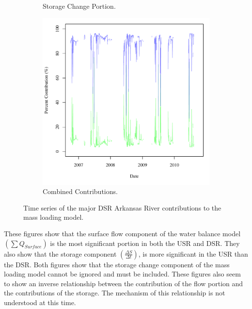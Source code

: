 \begin{linenumbers}
\begin{figure}[htbp]
\begin{subfigure}{0.5\textwidth}
		\caption{Storage Change Portion.}
	\end{subfigure}
	\tablevspace
	\begin{subfigure}{0.5\textwidth}
		\centering
		\includegraphics[width=\tableCustomSize]{"Figures/Results_DSR/Stochastic/M Mass Contrib 3"}
		\caption{Combined Contributions.}
	\end{subfigure}
	\caption[Time series of the major DSR Arkansas River contributions to the mass loading model.]{Time series of the major DSR Arkansas River contributions to the mass loading model.}
	\label{fig:DSRMassContrib}
\end{figure}

These figures show that the surface flow component of the water balance model $ \displaystyle \left( \sum Q_{Surface} \right) $ is the most significant portion in both the USR and DSR.  They also show that the storage component $ \displaystyle \left( \frac{\Delta S}{\Delta t} \right) $, is more significant in the USR than the DSR.  Both figures show that the storage change component of the mass loading model cannot be ignored and must be included.  These figures also seem to show an inverse relationship between the contribution of the flow portion and the contributions of the storage.  The mechanism of this relationship is not understood at this time.


\end{linenumbers}
